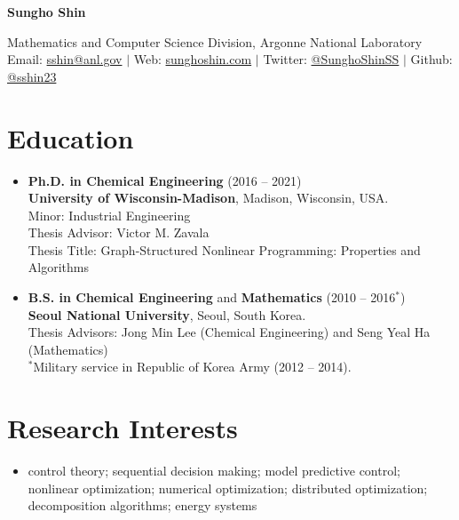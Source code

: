 \documentclass{article}
\begin{document}
\begin{center}
  {\bf\LARGE Sungho Shin}
\end{center}
\begin{center}
  {Mathematics and Computer Science Division}, {Argonne National Laboratory}\\
  Email: \href{mailto:sshin@anl.gov}{sshin@anl.gov} $|$ Web: \href{https://sunghoshin.com}{sunghoshin.com} $|$ Twitter: \href{https://twitter.com/SunghoShinSS}{@SunghoShinSS} $|$ Github: \href{https://github.com/sshin23}{@sshin23}
\end{center}

\section*{Education}
\begin{itemize}[leftmargin=*]
\item[]{\bf Ph.D. in Chemical Engineering} (2016 -- 2021)\\
  {\bf University of Wisconsin-Madison}, Madison, Wisconsin, USA. \\
  Minor: Industrial Engineering\\
  Thesis Advisor: Victor M. Zavala\\
  Thesis Title: Graph-Structured Nonlinear Programming: Properties and Algorithms
\item[]{\bf B.S. in Chemical Engineering} and {\bf Mathematics} (2010 -- 2016$^*$)\\
  {\bf Seoul National University}, Seoul, South Korea.\\
  Thesis Advisors: Jong Min Lee (Chemical Engineering) and Seng Yeal Ha (Mathematics)\\
  $^*$Military service in Republic of Korea Army (2012 -- 2014).
\end{itemize}

\section*{Research Interests}
\begin{itemize}[leftmargin=*]
\item[] control theory; sequential decision making; model predictive control; nonlinear optimization; numerical optimization; distributed optimization; decomposition algorithms; energy systems
\end{itemize}
\end{document}
